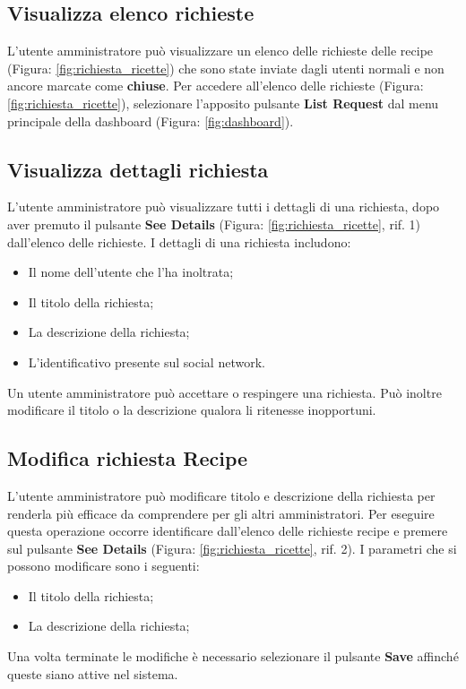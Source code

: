 	\pagebreak
	\subsection{Visualizza elenco richieste}
		L'utente amministratore può visualizzare un elenco delle richieste delle recipe\gloss{} (Figura: \ref{fig:richiesta_ricette}) che sono state inviate dagli utenti normali e non ancore marcate come \textbf{chiuse}.\newline
		Per accedere all'elenco delle richieste (Figura: \ref{fig:richiesta_ricette}), selezionare l'apposito pulsante \textbf{List Request} dal menu principale della dashboard\gloss{} (Figura: \ref{fig:dashboard}).
	

	\subsection{Visualizza dettagli richiesta}
		L'utente amministratore può visualizzare tutti i dettagli di una richiesta, dopo aver premuto il pulsante \textbf{See Details} (Figura: \ref{fig:richiesta_ricette}, rif. 1) dall'elenco delle richieste.\newline
		I dettagli di una richiesta includono:
		\begin{itemize}
			\item Il nome dell'utente che l'ha inoltrata;
			\item Il titolo della richiesta;
			\item La descrizione della richiesta;
			\item L'identificativo presente sul social network.
		\end{itemize}
		Un utente amministratore può accettare o respingere una richiesta.\newline
		Può inoltre modificare il titolo o la descrizione qualora li ritenesse inopportuni.
	
	
	\subsection{Modifica richiesta Recipe}
		L'utente amministratore può modificare titolo e descrizione della richiesta per renderla più efficace da comprendere per gli altri amministratori.
		Per eseguire questa operazione occorre identificare dall'elenco delle richieste recipe\gloss{} e premere sul pulsante \textbf{See Details} (Figura: \ref{fig:richiesta_ricette}, rif. 2).
		I parametri che si possono modificare sono i seguenti:
		\begin{itemize}
		 	\item Il titolo della richiesta;
		 	\item La descrizione della richiesta;
		\end{itemize}
		Una volta terminate le modifiche è necessario selezionare il pulsante \textbf{Save} affinché queste siano attive nel sistema.

